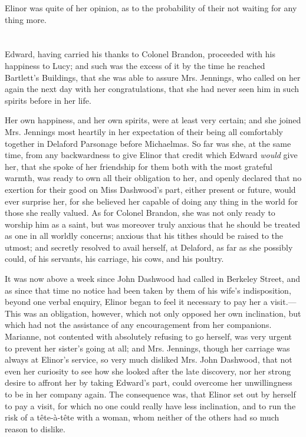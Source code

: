 

Elinor was quite of her opinion, as to the probability of their not waiting for any thing more.

\chapter{} %

Edward, having carried his thanks to Colonel Brandon, proceeded with his happiness to Lucy; and such was the excess of it by the time he reached Bartlett's Buildings, that she was able to assure Mrs. Jennings, who called on her again the next day with her congratulations, that she had never seen him in such spirits before in her life.

Her own happiness, and her own spirits, were at least very certain; and she joined Mrs. Jennings most heartily in her expectation of their being all comfortably together in Delaford Parsonage before Michaelmas. So far was she, at the same time, from any backwardness to give Elinor that credit which Edward {\em would} give her, that she spoke of her friendship for them both with the most grateful warmth, was ready to own all their obligation to her, and openly declared that no exertion for their good on Miss Dashwood's part, either present or future, would ever surprise her, for she believed her capable of doing any thing in the world for those she really valued. As for Colonel Brandon, she was not only ready to worship him as a saint, but was moreover truly anxious that he should be treated as one in all worldly concerns; anxious that his tithes should be raised to the utmost; and secretly resolved to avail herself, at Delaford, as far as she possibly could, of his servants, his carriage, his cows, and his poultry.

It was now above a week since John Dashwood had called in Berkeley Street, and as since that time no notice had been taken by them of his wife's indisposition, beyond one verbal enquiry, Elinor began to feel it necessary to pay her a visit.---This was an obligation, however, which not only opposed her own inclination, but which had not the assistance of any encouragement from her companions. Marianne, not contented with absolutely refusing to go herself, was very urgent to prevent her sister's going at all; and Mrs. Jennings, though her carriage was always at Elinor's service, so very much disliked Mrs. John Dashwood, that not even her curiosity to see how she looked after the late discovery, nor her strong desire to affront her by taking Edward's part, could overcome her unwillingness to be in her company again. The consequence was, that Elinor set out by herself to pay a visit, for which no one could really have less inclination, and to run the risk of a tête-à-tête with a woman, whom neither of the others had so much reason to dislike.

